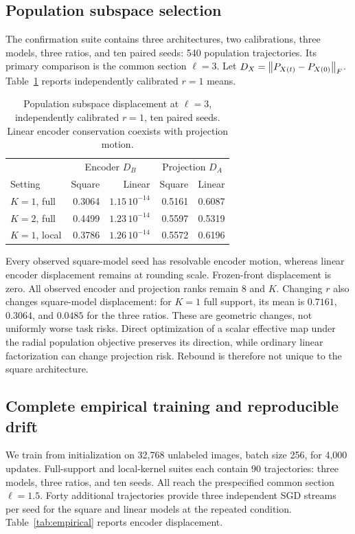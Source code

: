 \subsection{Population subspace selection}
The confirmation suite contains three architectures, two calibrations, three models, three ratios, and ten paired seeds: 540 population trajectories. Its primary comparison is the common section $\ell=3$. Let $D_X=\left\lVert P_{X(t)}-P_{X(0)}\right\rVert_F$. Table~\ref{tab:population} reports independently calibrated $r=1$ means.

\begin{table}[t]
\centering\small
\caption{Population subspace displacement at $\ell=3$, independently calibrated $r=1$, ten paired seeds. Linear encoder conservation coexists with projection motion.}
\label{tab:population}
\setlength{\tabcolsep}{3pt}
\begin{tabular}{lrrrr}
\toprule
&\multicolumn{2}{c}{Encoder $D_B$}&\multicolumn{2}{c}{Projection $D_A$}\\
Setting&Square&Linear&Square&Linear\\\midrule
$K=1$, full&0.3064&$1.15\,10^{-14}$&0.5161&0.6087\\
$K=2$, full&0.4499&$1.23\,10^{-14}$&0.5597&0.5319\\
$K=1$, local&0.3786&$1.26\,10^{-14}$&0.5572&0.6196\\
\bottomrule
\end{tabular}
\end{table}

Every observed square-model seed has resolvable encoder motion, whereas linear encoder displacement remains at rounding scale. Frozen-front displacement is zero. All observed encoder and projection ranks remain $8$ and $K$. Changing $r$ also changes square-model displacement: for $K=1$ full support, its mean is $0.7161$, $0.3064$, and $0.0485$ for the three ratios. These are geometric changes, not uniformly worse task risks. Direct optimization of a scalar effective map under the radial population objective preserves its direction, while ordinary linear factorization can change projection risk. Rebound is therefore not unique to the square architecture.

\subsection{Complete empirical training and reproducible drift}
We train from initialization on 32,768 unlabeled images, batch size 256, for 4,000 updates. Full-support and local-kernel suites each contain 90 trajectories: three models, three ratios, and ten seeds. All reach the prespecified common section $\ell=1.5$. Forty additional trajectories provide three independent SGD streams per seed for the square and linear models at the repeated condition. Table~\ref{tab:empirical} reports encoder displacement.

